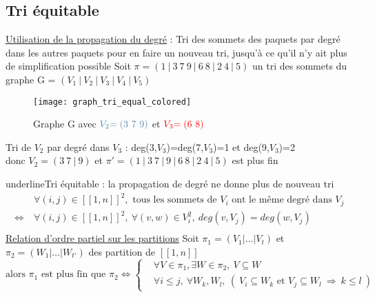 \documentclass[a4paper, french, twoside]{article}
\begin{document}
\subsection{Tri équitable \cite{mckay_label}}
\noindent \underline{Utilisation de la propagation du degré} : \newline \newline 
Tri des sommets des paquets par degré dans les autres paquets pour en faire un nouveau tri,
jusqu'à ce qu'il n'y ait plus de simplification possible \newline \newline
Soit $\pi = (1\ |\ 3\ 7\ 9\ |\ 6\ 8\ |\ 2\ 4\ |\ 5)$ un tri des sommets du graphe G \newline
\hspace*{0.9cm} = $(V_1\ |\ V_2\ |\ V_3 \ | \ V_4\ |\ V_5)$

\begin{figure}[!htb]
    \centering
    \texttt{[image: graph\_tri\_equal\_colored]}
    \caption{\label{fig:graph_tri_colored} Graphe G avec $\textcolor{airforceblue}{V_2} \textcolor{airforceblue}{=(3 \ 7\ 9)}$ et $\textcolor{red}{V_3} \textcolor{red}{=(6\ 8)}$}
\end{figure} 
\begin{center}
    Tri de $V_2$ par degré dans $V_3$ : deg(3,$V_3$)=deg(7,$V_3$)=1 et deg(9,$V_3$)=2 \\
    donc $V_2 = (3\ 7\ |\ 9)$ et $\pi ' = (1\ |\ 3\ 7\ |\ 9\ |\ 6\ 8\ |\ 2\ 4\ |\ 5)$ est plus fin
\end{center}

\noindent underline{Tri équitable} : la propagation de degré ne donne plus de nouveau tri
\begin{align*}
    & \forall (i,j)\in[\![1,n]\!]^2, \text{ tous les sommets de } V_i \text{ ont le même degré dans } V_j \\
    \iff \ & \forall (i,j)\in[\![1,n]\!]^2,\ 
    \forall (v,w) \in V_i^2,\ deg(v,V_j)=deg(w,V_j) \\
\end{align*}
\underline{Relation d'ordre partiel sur les partitions}
Soit $\pi_1 = (V_1|\dots| V_t)$ et $\pi_2=(W_1|\dots| W_{t'})$ des partition de $[\![1,n]\!]$
\begin{equation}
    \text{alors } \pi_1 \text{ est plus fin que } \pi_2 \iff
    \left\{
    \begin{array}{ll}
        & \forall V \in \pi_1, \exists W \in \pi_2,\ V\subseteq W \\
        & \forall i \leq j,\ \forall W_k,W_l,\ (\ V_i\subseteq W_k \text{ et } V_j\subseteq W_l \ \Rightarrow 
        \ k \leq l \ )
    \end{array}
    \right.
\end{equation}
\end{document}

